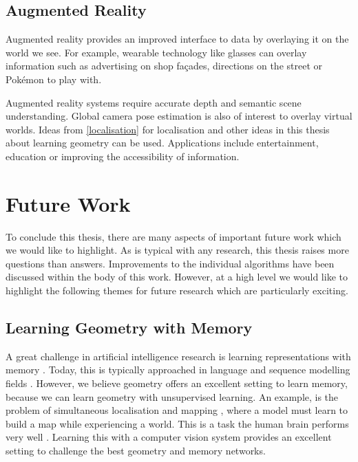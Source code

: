 \subsection{Augmented Reality}
Augmented reality provides an improved interface to data by overlaying it on the world we see. For example, wearable technology like glasses can overlay information such as advertising on shop façades, directions on the street or Pokémon to play with.

Augmented reality systems require accurate depth and semantic scene understanding. Global camera pose estimation is also of interest to overlay virtual worlds. Ideas from \cref{localisation} for localisation and other ideas in this thesis about learning geometry can be used. Applications include entertainment, education or improving the accessibility of information.



\section{Future Work}

To conclude this thesis, there are many aspects of important future work which we would like to highlight. As is typical with any research, this thesis raises more questions than answers. Improvements to the individual algorithms have been discussed within the body of this work. However, at a high level we would like to highlight the following themes for future research which are particularly exciting.

\subsection{Learning Geometry with Memory}
A great challenge in artificial intelligence research is learning representations with memory \citep{graves2014neural}. Today, this is typically approached in language and sequence modelling fields \citep{weston2014memory}. However, we believe geometry offers an excellent setting to learn memory, because we can learn geometry with unsupervised learning. An example, is the problem of simultaneous localisation and mapping \citep{durrant2006simultaneous}, where a model must learn to build a map while experiencing a world. This is a task the human brain performs very well \citep{moser2008place,o1978hippocampus}. Learning this with a computer vision system provides an excellent setting to challenge the best geometry and memory networks.

